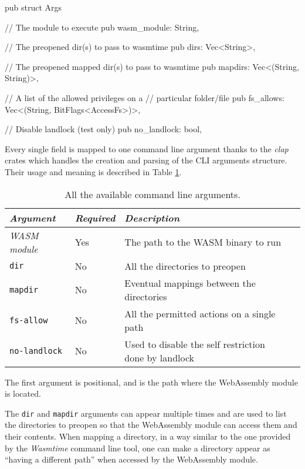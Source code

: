 \begin{code}[language=rust, caption=The \texttt{Args} struct., label=lst:arg-struct]
pub struct Args {
  // The module to execute
  pub wasm_module: String,

  // The preopened dir(s) to pass to wasmtime
  pub dirs: Vec<String>,

  // The preopened mapped dir(s) to pass to wasmtime
  pub mapdirs: Vec<(String, String)>,

  // A list of the allowed privileges on a
  // particular folder/file
  pub fs_allows: Vec<(String, BitFlags<AccessFs>)>,

  // Disable landlock (test only)
  pub no_landlock: bool,
}
\end{code}

Every single field is mapped to one command line argument thanks to the \textit{clap} crates which handles the
creation and parsing of the CLI arguments structure.
Their usage and meaning is described in Table \ref{table:landlock-cli-args}.

\begin{table}
  \centering
  \begin{tabular}{|l|l|l|l|}
    \hline
    \textit{Argument} & \textit{Required} & \textit{Description} \\
    \hline\hline
    \textit{WASM module} & Yes & The path to the WASM binary to run \\ \hline
    \texttt{dir} & No & All the directories to preopen \\ \hline
    \texttt{mapdir} & No & Eventual mappings between the directories \\ \hline
    \texttt{fs-allow} & No & All the permitted actions on a single path \\ \hline
    \texttt{no-landlock} & No & Used to disable the self restriction done by landlock \\
    \hline
  \end{tabular}
  \caption{All the available command line arguments.}
  \label{table:landlock-cli-args}
\end{table}

The first argument is positional, and is the path where the WebAssembly module is located.

The \texttt{dir} and \texttt{mapdir} arguments can appear multiple times and are used to list the directories to preopen
so that the WebAssembly module can access them and their contents.
When mapping a directory, in a way similar to the one provided by the \textit{Wasmtime} command line tool, one can make a
directory appear as ``having a different path'' when accessed by the WebAssembly module.

